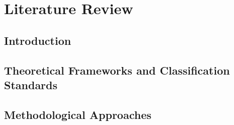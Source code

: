 
\chapter{Literature Review}

\section{Introduction}



\section{Theoretical Frameworks and Classification Standards}




\section{Methodological Approaches}

